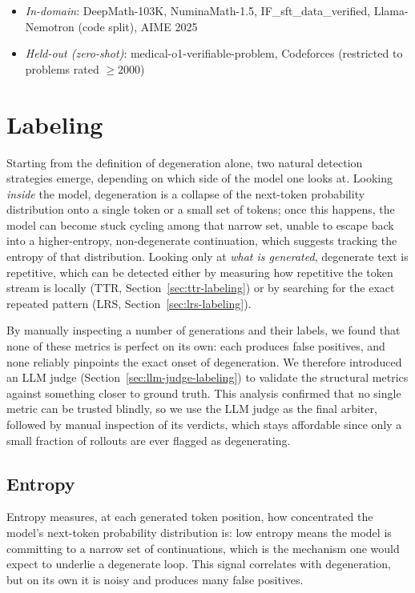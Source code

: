 \documentclass{article}
\begin{document}
\begin{itemize}
    \item \emph{In-domain}: DeepMath-103K, NuminaMath-1.5, IF\_sft\_data\_verified, Llama-Nemotron (code split), AIME 2025
    \item \emph{Held-out (zero-shot)}: medical-o1-verifiable-problem, Codeforces (restricted to problems rated $\geq 2000$)
\end{itemize}

\section{Labeling}

Starting from the definition of degeneration alone, two natural detection
strategies emerge, depending on which side of the model one looks at. Looking
\emph{inside} the model, degeneration is a collapse of the next-token
probability distribution onto a single token or a small set of tokens; once
this happens, the model can become stuck cycling among that narrow set,
unable to escape back into a higher-entropy, non-degenerate continuation,
which suggests tracking the entropy of that distribution. Looking only at
\emph{what is generated}, degenerate text is repetitive, which can be
detected either by measuring how repetitive the token stream is locally
(TTR, Section~\ref{sec:ttr-labeling}) or by searching for the exact repeated
pattern (LRS, Section~\ref{sec:lrs-labeling}).

By manually inspecting a number of generations and their labels, we found
that none of these metrics is perfect on its own: each produces false
positives, and none reliably pinpoints the exact onset of degeneration. We
therefore introduced an LLM judge (Section~\ref{sec:llm-judge-labeling}) to
validate the structural metrics against something closer to ground truth.
This analysis confirmed that no single metric can be trusted blindly, so we
use the LLM judge as the final arbiter, followed by manual inspection of its
verdicts, which stays affordable since only a small fraction of rollouts are
ever flagged as degenerating.

\subsection{Entropy}
\label{sec:entropy-labeling}

Entropy measures, at each generated token position, how concentrated the
model's next-token probability distribution is: low entropy means the model
is committing to a narrow set of continuations, which is the mechanism one
would expect to underlie a degenerate loop. This signal correlates with
degeneration, but on its own it is noisy and produces many false positives.
\end{document}
